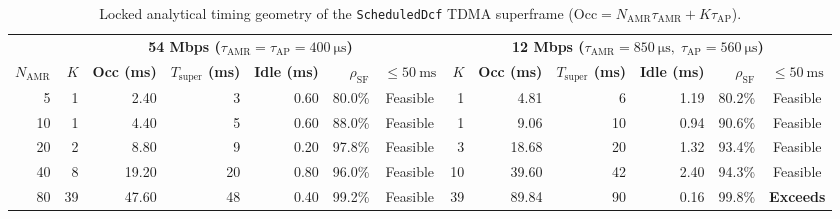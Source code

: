 \documentclass[11pt,a4paper]{article}
\newcommand{\Namr}{\ensuremath{N_{\mathrm{AMR}}}}
\newcommand{\Tsuper}{\ensuremath{T_{\mathrm{super}}}}
\begin{document}
\begin{table}[!tb]
\centering
\scriptsize
\setlength{\tabcolsep}{2.0pt}
\caption{Locked analytical timing geometry of the \texttt{ScheduledDcf} TDMA superframe ($\mathrm{Occ} = \Namr \tau_{\mathrm{AMR}} + K \tau_{\mathrm{AP}}$).}
\label{tab:tdma_feasibility}
\begin{tabular}{@{}r r r r r r c r r r r r c@{}}
\toprule
 & \multicolumn{6}{c}{\textbf{54 Mbps ($\tau_{\mathrm{AMR}} = \tau_{\mathrm{AP}} = \qty{400}{\micro\second}$)}} & \multicolumn{6}{c}{\textbf{12 Mbps ($\tau_{\mathrm{AMR}} = \qty{850}{\micro\second},\; \tau_{\mathrm{AP}} = \qty{560}{\micro\second}$)}} \\
\cmidrule(lr){2-7} \cmidrule(lr){8-13}
\textbf{$\Namr$} & \textbf{$K$} & \textbf{Occ (ms)} & \textbf{$\Tsuper$ (ms)} & \textbf{Idle (ms)} & \textbf{$\rho_{\mathrm{SF}}$} & \textbf{$\le \qty{50}{\milli\second}$} & \textbf{$K$} & \textbf{Occ (ms)} & \textbf{$\Tsuper$ (ms)} & \textbf{Idle (ms)} & \textbf{$\rho_{\mathrm{SF}}$} & \textbf{$\le \qty{50}{\milli\second}$} \\
\midrule
5  & 1  & 2.40  & 3  & 0.60 & 80.0\% & Feasible & 1  & 4.81  & 6  & 1.19 & 80.2\% & Feasible \\
10 & 1  & 4.40  & 5  & 0.60 & 88.0\% & Feasible & 1  & 9.06  & 10 & 0.94 & 90.6\% & Feasible \\
20 & 2  & 8.80  & 9  & 0.20 & 97.8\% & Feasible & 3  & 18.68 & 20 & 1.32 & 93.4\% & Feasible \\
40 & 8  & 19.20 & 20 & 0.80 & 96.0\% & Feasible & 10 & 39.60 & 42 & 2.40 & 94.3\% & Feasible \\
80 & 39 & 47.60 & 48 & 0.40 & 99.2\% & Feasible & 39 & 89.84 & 90 & 0.16 & 99.8\% & \textbf{Exceeds} \\
\bottomrule
\end{tabular}
\end{table}
\end{document}
